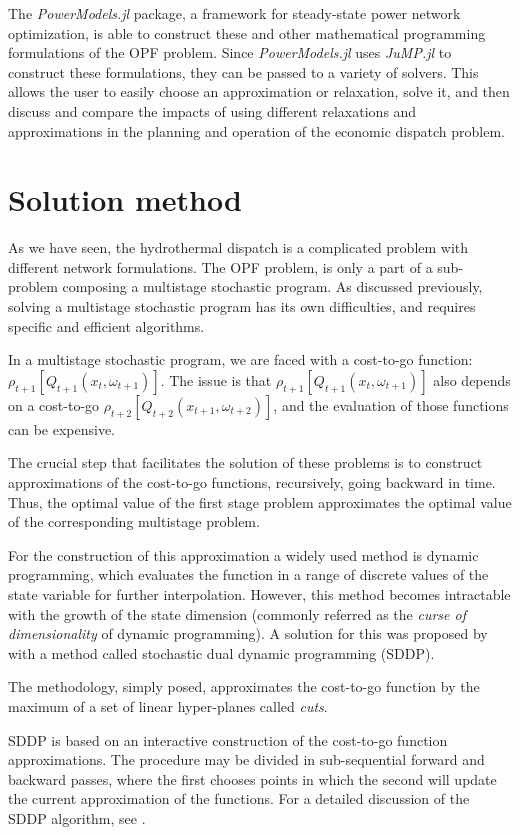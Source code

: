 \documentclass{juliacon}
\begin{document}
The \textit{PowerModels.jl} package, a framework for steady-state power network optimization, is able to construct these and other mathematical programming formulations of the OPF problem. Since \textit{PowerModels.jl} uses \textit{JuMP.jl} to construct these formulations, they can be passed to a variety of solvers. This allows the user to easily choose an approximation or relaxation, solve it, and then discuss and compare the impacts of using different relaxations and approximations in the planning and operation of the economic dispatch problem.

\section{Solution method}
\label{sec:sddp}

As we have seen, the hydrothermal dispatch is a complicated problem with different network formulations. The OPF problem, is only a part of a sub-problem composing a multistage stochastic program. As discussed previously, solving a multistage stochastic program has its own difficulties, and requires specific and efficient algorithms.

In a multistage stochastic program, we are faced with a cost-to-go function: $\rho_{t+1}[Q_{t+1}(x_{t}, \omega_{t+1})]$. The issue is that $\rho_{t+1}[Q_{t+1}(x_{t}, \omega_{t+1})]$ also depends on a cost-to-go $\rho_{t+2}[Q_{t+2}(x_{t+1}, \omega_{t+2})]$, and the evaluation of those functions can be expensive.

The crucial step that facilitates the solution of these problems is to construct approximations of the cost-to-go functions, recursively, going backward in time. Thus, the optimal value of the first stage problem approximates the optimal value of the corresponding multistage problem.

For the construction of this approximation a widely used method is dynamic programming, which evaluates the function in a range of discrete values of the state variable for further interpolation. However, this method becomes intractable with the growth of the state dimension (commonly referred as the \textit{curse of dimensionality} of dynamic programming). A solution for this was proposed by \cite{pereira1991multi} with a method called stochastic dual dynamic programming (SDDP).

The methodology, simply posed, approximates the cost-to-go function by the maximum of a set of linear hyper-planes called \textit{cuts}.

SDDP is based on an interactive construction of the cost-to-go function approximations. The procedure may be divided in sub-sequential forward and backward passes, where the first chooses points in which the second will update the current approximation of the functions. For a detailed discussion of the SDDP algorithm, see \cite{pereira1991multi,dowson_sddp.jl}.
\end{document}
